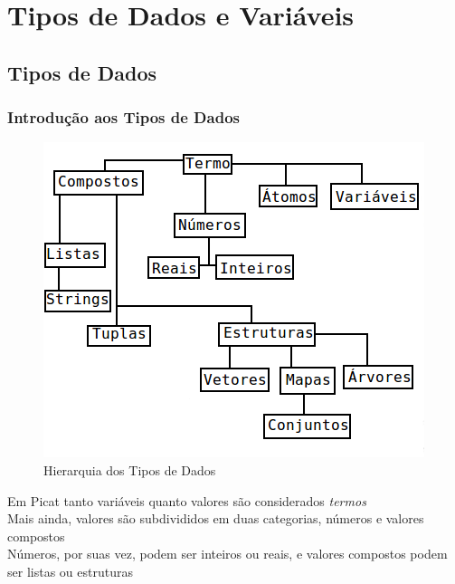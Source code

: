 \section{Tipos de Dados e Variáveis}
\subsection{Tipos de Dados}

\begin{frame}
	\frametitle{Introdução aos Tipos de Dados}
	
	\centering
	\begin{figure}[!ht]
		\includegraphics[width = .725\linewidth]{figures/tipos_dados_picat__traduzido3.png}
		\caption{Hierarquia dos Tipos de Dados}
		\label{fig:TiposDados}
	\end{figure}
\end{frame}


\begin{frame}
	
	Em Picat tanto variáveis quanto valores são considerados \textit{termos}\\
	
	Mais ainda, valores são subdivididos em duas categorias, números e valores 
	compostos\\
	
	Números, por suas vez, podem ser inteiros ou reais, e valores compostos
	podem ser listas ou estruturas\\
	
\end{frame}


